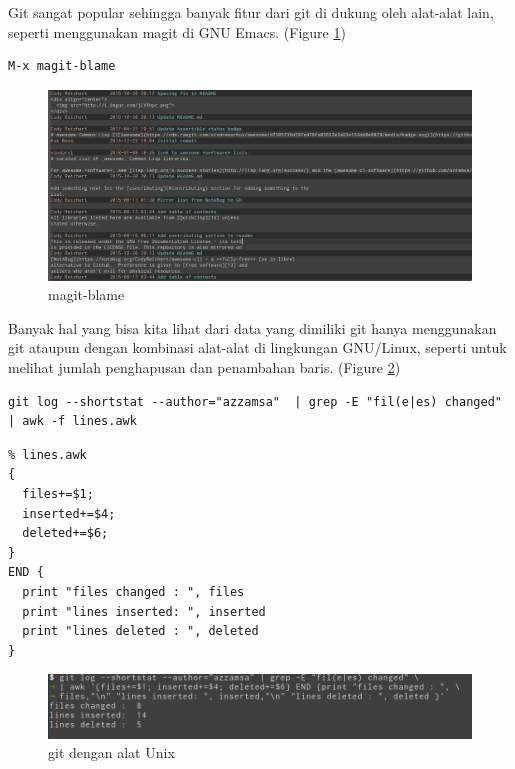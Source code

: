 \documentclass[a4paper,11pt]{article}
\begin{document}
\noindent
Git sangat popular sehingga banyak fitur dari git di dukung oleh alat-alat lain,
seperti menggunakan magit di GNU Emacs. (Figure \ref{fig:magit})

\begin{verbatim}
M-x magit-blame
\end{verbatim}

\begin{figure}[tp]
  \centering
  \includegraphics[width=.9\linewidth]{img/fig-5.png}
  \caption{magit-blame}
  \label{fig:magit}
\end{figure}

Banyak hal yang bisa kita lihat dari data yang dimiliki git hanya
menggunakan git ataupun dengan kombinasi alat-alat di lingkungan
GNU/Linux, seperti untuk melihat jumlah penghapusan dan penambahan baris. (Figure \ref{fig:git-awk})

\begin{verbatim}
git log --shortstat --author="azzamsa"  | grep -E "fil(e|es) changed" | awk -f lines.awk
\end{verbatim}

\begin{verbatim}
% lines.awk
{
  files+=$1;
  inserted+=$4;
  deleted+=$6;
}
END {
  print "files changed : ", files
  print "lines inserted: ", inserted
  print "lines deleted : ", deleted
}
\end{verbatim}


\begin{figure}[tb]
  \centering
  \includegraphics[width=.9\linewidth]{img/fig-3.png}
  \caption{git dengan alat Unix}
  \label{fig:git-awk}
\end{figure}
\end{document}
